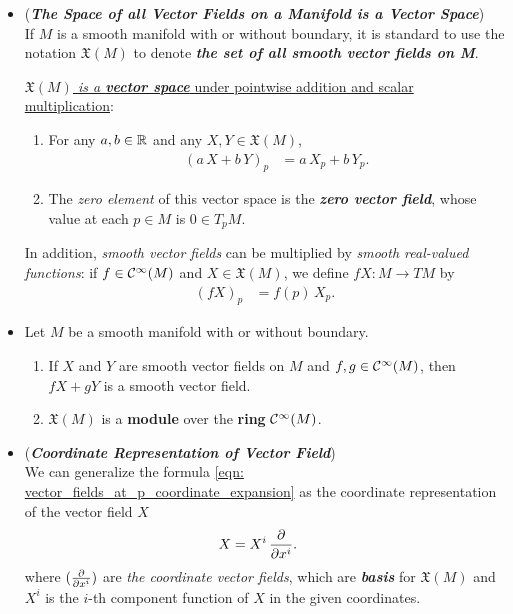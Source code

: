 \documentclass[11pt]{article}
\begin{document}
\begin{itemize}
\item \begin{remark} (\emph{\textbf{The Space of all Vector Fields on a Manifold is a Vector Space}})\\
If $M$ is a smooth manifold with or without boundary, it is standard to use the notation $\mathfrak{X}(M)$ to denote \emph{\textbf{the set of all smooth vector fields on M}}. 

\underline{\emph{$\mathfrak{X}(M)$ is a \textbf{vector space}} under pointwise addition and scalar multiplication}:
\begin{enumerate}
\item For any $a, b \in {\mathbb R}$ and any $X, Y \in \mathfrak{X}(M)$,
\begin{align*}
(a\,X + b\,Y)_{p} &= a\,X_{p} + b\,Y_{p}.
\end{align*}
\item The \emph{zero element} of this vector space is the \emph{\textbf{zero vector field}}, whose value at each $p \in M$ is $0 \in T_{p}M$.
\end{enumerate}

In addition, \emph{smooth vector fields} can be multiplied by \emph{smooth real-valued functions}: if $f \in {\mathcal C}^{\infty}(M)$ and $X \in \mathfrak{X}(M)$, we define $fX: M \rightarrow TM$ by
\begin{align*}
(fX)_p &= f(p)\, X_p.
\end{align*}
\end{remark}

\item \begin{proposition}
Let $M$ be a smooth manifold with or without boundary.
\begin{enumerate}
\item If $X$ and $Y$ are smooth vector fields on $M$ and $f,g \in {\mathcal C}^{\infty}(M)$, then $fX + gY $ is a smooth vector field.
\item $\mathfrak{X}(M)$ is a \textbf{module} over the \textbf{ring} ${\mathcal C}^{\infty}(M)$.
\end{enumerate}
\end{proposition}

\item \begin{remark} (\emph{\textbf{Coordinate Representation of Vector Field}})\\
We can generalize the formula \eqref{eqn: vector_fields_at_p_coordinate_expansion} as the coordinate representation of the vector field $X$
\begin{align}
X &= X^{i}\,\frac{\partial }{ \partial x^{i}}.  \label{eqn: vector_fields_coordinate_expansion}
\end{align}  where $(\frac{\partial }{ \partial x^{i}})$ are \emph{the coordinate vector fields}, which are \emph{\textbf{basis}} for $\mathfrak{X}(M)$ and $X^i$ is the $i$-th component function of $X$ in the given coordinates.


\end{remark}
\end{itemize}
\end{document}

